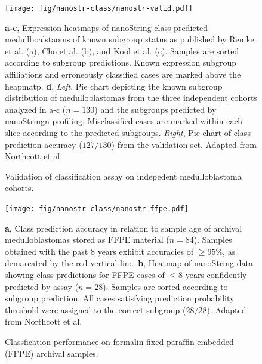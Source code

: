\documentclass[11pt,letterpaper]{article}
\theoremstyle{definition}
\begin{document}
\begin{figure}[h]
	\begin{center}
		\texttt{[image: fig/nanostr-class/nanostr-valid.pdf]}
	\end{center}
	\caption{Validation of classification assay on indepedent medulloblastoma cohorts.}
	\textbf{a-c}, Expression heatmaps of nanoString class-predicted medullboalstaoms of known subgroup status as published by Remke et al. (a), Cho et al. (b), and Kool et al. (c). Samples are sorted according to subgroup predictions. Known expression subgroup affiliations and erroneously classified cases are marked above the heapmatp. \textbf{d}, \emph{Left}, Pie chart depicting the known subgroup distribution of medulloblastomas from the three independent cohorts analyzed in a-c ($n = 130$) and the subgroups predicted by nanoStringn profiling. Misclassified cases are marked within each slice according to the predicted subgroups. \emph{Right}, Pie chart of class prediction accuracy ($127/130$) from the validation set. Adapted from Northcott et al.
	\label{fig:nanostr-valid}
\end{figure}

\begin{figure}[h]
	\begin{center}
		\texttt{[image: fig/nanostr-class/nanostr-ffpe.pdf]}
	\end{center}
	\caption{Classfication performance on formalin-fixed paraffin embedded (FFPE) archival samples.}
	\textbf{a}, Class prediction accuracy in relation to sample age of archival medulloblastomas stored as FFPE material ($n = 84$). Samples obtained with the past 8 years exhibit accuracies of $\geq 95\%$, as demarcated by the red vertical line. \textbf{b}, Heatmap of nanoString data showing class predictions for FFPE cases of $\leq 8$ years confidently predicted by assay ($n = 28$). Samples are sorted according to subgroup prediction. All cases satisfying prediction probability threshold were assigned to the correct subgroup ($28/28$). Adapted from Northcott et al.
	\label{fig:nanostr-ffpe}
\end{figure}

\clearpage
\end{document}
